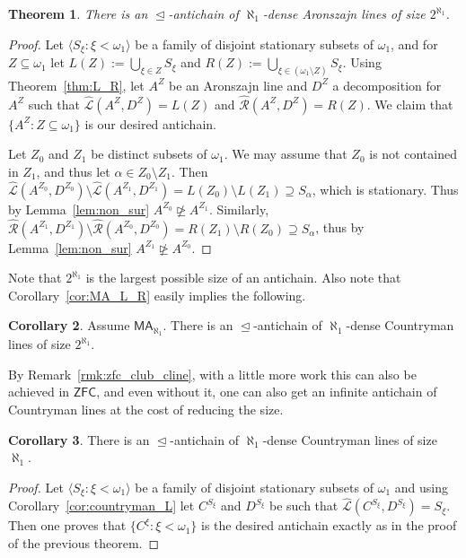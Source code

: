 \documentclass[10pt]{amsart}
\newtheorem{theorem}{Theorem}[section]
\theoremstyle{definition}
\newtheorem{corollary}[theorem]{Corollary}
\theoremstyle{remark}
\newcommand{\seb}{\subseteq}
\newcommand{\setm}{\setminus}
\newcommand{\tup}[1]{\langle#1\rangle}
\newcommand{\axiom}[1]{\mathsf{#1}}
\newcommand{\ZFC}{\axiom{ZFC}}
\newcommand{\MA}{\axiom{MA}}
\newcommand{\sleq}{\trianglelefteq}
\newcommand{\nsgeq}{\ntrianglerighteq}
\renewcommand{\L}{\mathscr{L}}
\newcommand{\R}{\mathscr{R}}
\newcommand{\La}{\hat{\L}}
\newcommand{\Ra}{\hat{\R}}
\newcommand{\1}{\mathbbm{1}}
\begin{document}
\begin{theorem}
  There is an $\sleq$-antichain of
  $\aleph_{1}$-dense Aronszajn lines of size $2^{\aleph_{1}}$.
\end{theorem}
\begin{proof}
  Let $\tup{S_{\xi}
    : \xi < \omega_{1}}$ be a family of disjoint stationary subsets of
  $\omega_{1}$, and for $Z \seb \omega_{1}$ let $L(Z) := \bigcup_{\xi
    \in Z}S_{\xi}$ and $R(Z) := \bigcup_{\xi \in (\omega_{1}\setm
    Z)}S_{\xi}$. Using Theorem~\ref{thm:L_R}, let $A^{Z}$ be an Aronszajn line
  and $D^{Z}$ a decomposition for $A^{Z}$ such that
  $\La(A^{Z},D^{Z}) = L(Z)$ and $\Ra(A^{Z},D^{Z}) = R(Z)$.
  We claim that $\{A^{Z} : Z \seb \omega_{1}\}$ is our desired antichain.

  Let $Z_{0}$ and $Z_{1}$ be distinct subsets of $\omega_{1}$. We may assume
  that $Z_{0}$ is not contained in $Z_{1}$, and thus let
  $\alpha \in Z_{0} \setm Z_{1}$. Then
  $\La(A^{Z_{0}},D^{Z_{0}})\setm \La(A^{Z_{1}},D^{Z_{1}}) =
  L(Z_{0}) \setm L(Z_{1}) \supseteq S_{\alpha}$, which is stationary.
  Thus by Lemma~\ref{lem:non_sur} $A^{Z_{0}} \nsgeq A^{Z_{1}}$.
  Similarly,
  $\Ra(A^{Z_{1}},D^{Z_{1}})\setm \Ra(A^{Z_{0}},D^{Z_{0}}) =
  R(Z_{1}) \setm R(Z_{0}) \supseteq S_{\alpha}$, thus
  by Lemma~\ref{lem:non_sur} $A^{Z_{1}} \nsgeq A^{Z_{0}}$.
\end{proof}

Note that $2^{\aleph_{1}}$ is the largest possible size of an antichain. Also
note that Corollary~\ref{cor:MA_L_R} easily implies the following.

\begin{corollary}\label{cor:cline_antichain_max}
  Assume $\MA_{\aleph_{1}}$. There is an $\sleq$-antichain of
  $\aleph_{1}$-dense Countryman lines of size $2^{\aleph_{1}}$.
\end{corollary}

By Remark~\ref{rmk:zfc_club_cline}, with a little more work this can
also be achieved in $\ZFC$, and even without it, one can also get
an infinite antichain of Countryman lines at the cost of reducing the size.

\begin{corollary}
  There is an $\sleq$-antichain of
  $\aleph_{1}$-dense Countryman lines of size $\aleph_{1}$.
\end{corollary}
\begin{proof}
  Let $\tup{S_{\xi}
    : \xi < \omega_{1}}$ be a family of disjoint stationary subsets of
  $\omega_{1}$ and using Corollary~\ref{cor:countryman_L} let $C^{S_{\xi}}$ and $D^{S_{\xi}}$
  be such that $\La(C^{S_{\xi}},D^{S_{\xi}}) = S_{\xi}$. Then one proves
  that $\{C^{\xi} : \xi < \omega_{1}\}$ is the desired antichain exactly
  as in the proof of the previous theorem.
\end{proof}
\end{document}

